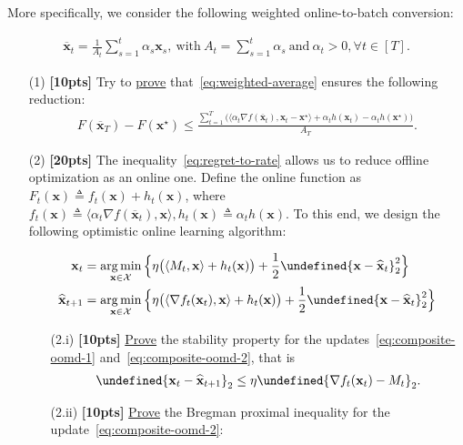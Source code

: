 \documentclass[a4paper]{article}
\numberwithin{equation}{section}
\theoremstyle{definition}
\newcommand\inner[2]{\langle #1, #2 \rangle}
\DeclareMathOperator*{\argmin}{arg\,min}
\theoremstyle{definition}
\def \X {\mathcal{X}}
\def \x {\textbf{x}}
\def \xs {\x^\star}
\def \xh {\widehat{\x}}
\def \xh {\widehat{\x}}
\let\norm\undefined
\DeclarePairedDelimiter\norm{\lVert}{\rVert}
\begin{document}
More specifically, we consider the following weighted online-to-batch conversion:
\begin{tcolorbox}[top=-10pt, bottom=0pt]
  \begin{align}
    \overline{\x}_t = \frac{1}{A_t}\sum_{s=1}^{t}\alpha_s \x_s,\ \text{with} \ A_t = \sum_{s=1}^{t}\alpha_s \ \text{and}\ \alpha_t>0,\forall t\in[T]. \label{eq:weighted-average}
  \end{align}
\end{tcolorbox}
\begin{enumerate}
  \item[(1)] \textbf{[10pts]} Try to \underline{prove} that~\eqref{eq:weighted-average} ensures the following reduction:
  \begin{align}
    \label{eq:regret-to-rate}
    F(\overline{\x}_T) - F(\xs) \le \frac{\sum_{t=1}^T\big( \inner{\alpha_t \nabla f(\overline{\x}_t)}{\x_t - \xs} + \alpha_t h(\x_t) - \alpha_t h(\xs) \big)}{A_T}.
  \end{align}
  \item[(2)] \textbf{[20pts]} The inequality~\eqref{eq:regret-to-rate} allows us to reduce offline optimization as an online one. Define the online function as $F_t(\x)\triangleq f_t(\x) + h_t(\x)$, where $f_t(\x)\triangleq \inner{\alpha_t \nabla f(\overline{\x}_t)}{\x}, h_t(\x)\triangleq \alpha_t h(\x)$. To this end, we design the following optimistic online learning algorithm:
  \begin{tcolorbox}[top=-7pt, bottom=1pt]
    \begin{align}
      \label{eq:composite-oomd-1}
      \x_t &= \argmin_{\x\in\X} \Big\{ \eta \big(\inner{M_t}{\x} + h_t(\x)\big) + \frac{1}{2}\norm{\x - \xh_t}_2^2 \Big\} \\
      \label{eq:composite-oomd-2}
      \xh_{t+1} &= \argmin_{\x\in\X} \Big\{ \eta \big(\inner{\nabla f_t(\x_t)}{\x} + h_t(\x)\big) + \frac{1}{2}\norm{\x - \xh_t}_2^2 \Big\}
    \end{align}
  \end{tcolorbox}
  \begin{enumerate}
    \item[(2.i)] \textbf{[10pts]} \underline{Prove} the stability property for the updates~\eqref{eq:composite-oomd-1} and~\eqref{eq:composite-oomd-2}, that is
    \label{eq:composite-stability}
    \begin{align*}  
      \norm{\x_t - \xh_{t+1}}_2 \le \eta\norm{\nabla f_t(\x_t) - M_t}_2.
    \end{align*}
    \item[(2.ii)] \textbf{[10pts]} \underline{Prove} the Bregman proximal inequality for the update~\eqref{eq:composite-oomd-2}:

\end{enumerate}
\end{enumerate}
\end{document}
